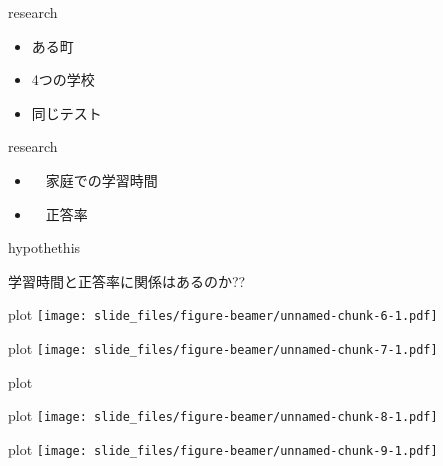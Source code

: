 \documentclass[
  ignorenonframetext,
]{beamer}
\providecommand{\tightlist}{%
  \setlength{\itemsep}{0pt}\setlength{\parskip}{0pt}}
\begin{document}
\begin{frame}{research}
\protect\hypertarget{research}{}
\LARGE

\begin{itemize}[<+->]
\tightlist
\item
  \textbullet ある町
\item
  \textbullet\hspace{1pt} 4つの学校
\item
  \textbullet 同じテスト
\end{itemize}
\end{frame}

\begin{frame}{research}
\protect\hypertarget{research-1}{}
\LARGE

\begin{itemize}[<+->]
\tightlist
\item
  　\textbullet 家庭での学習時間
\item
  　\textbullet 正答率
\end{itemize}
\end{frame}

\begin{frame}{hypothethis}
\protect\hypertarget{hypothethis}{}
\LARGE

学習時間と正答率に関係はあるのか??
\end{frame}

\begin{frame}{plot}
\protect\hypertarget{plot}{}
\texttt{[image: slide\_files/figure-beamer/unnamed-chunk-6-1.pdf]}
\end{frame}

\begin{frame}{plot}
\protect\hypertarget{plot-1}{}
\texttt{[image: slide\_files/figure-beamer/unnamed-chunk-7-1.pdf]}
\end{frame}

\begin{frame}{plot}
\protect\hypertarget{plot-2}{}
\end{frame}

\begin{frame}{plot}
\protect\hypertarget{plot-3}{}
\texttt{[image: slide\_files/figure-beamer/unnamed-chunk-8-1.pdf]}
\end{frame}

\begin{frame}{plot}
\protect\hypertarget{plot-4}{}
\texttt{[image: slide\_files/figure-beamer/unnamed-chunk-9-1.pdf]}
\end{frame}
\end{document}
